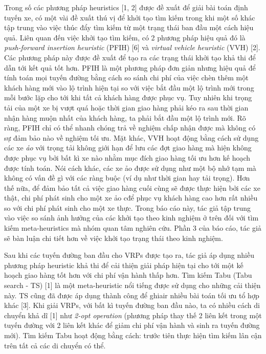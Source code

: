 Trong số các phương pháp heuristics [1, 2] được đề xuất để giải bài toán định tuyến xe, có một vài đề xuất thú vị để khởi tạo tìm kiếm trong khi một số khác tập trung vào việc thúc đẩy tìm kiếm từ một trạng thái ban đầu một cách hiệu quả. Liên quan đến việc khởi tạo tìm kiếm, có 2 phương pháp hiệu quả đó là \textit{push-forward insertion heuristic} (PFIH) [6] và \textit{ virtual vehicle heuristic} (VVH) [2]. Các phương pháp này được đề xuất để tạo ra các trạng thái khởi tạo khả thi để dẫn tới kết quả tốt hơn. PFIH là một phương pháp đơn giản nhưng hiệu quả để tính toán mọi tuyến đường bằng cách so sánh chi phí của việc chèn thêm một khách hàng mới vào lộ trình hiện tại so với việc bắt đầu một lộ trình mới trong mỗi bước lặp cho tới khi tất cả khách hàng được phục vụ. Tuy nhiên khi trọng tải của một xe bị vượt quá hoặc thời gian giao hàng phải kéo ra sau thời gian nhận hàng muộn nhất của khách hàng, ta phải bắt đầu một lộ trình mới. Rõ ràng, PFIH chỉ có thể nhanh chóng trả về nghiệm chấp nhận được mà không có sự đảm bảo nào về nghiệm tối ưu. Mặt khác, VVH hoạt động bằng cách sử dụng các xe \textit{ảo} với trọng tải không giới hạn để lưu các đợt giao hàng mà hiện không được phục vụ bởi bất kì xe nào nhằm mục đích giao hàng tối ưu hơn kế hoạch được tính toán. Nói cách khác, các xe ảo được sử dụng như một bộ nhớ tạm mà không có vấn đề gì với các ràng buộc (ví dụ như thời gian hay tải trọng). Hơn thế nữa, để đảm bảo tất cả việc giao hàng cuối cùng sẽ được thực hiện bởi các xe thật, chi phí phát sinh cho một xe ảo cđể phục vụ khách hàng cao hơn rất nhiều so với chi phí phát sinh cho một xe thực. Trong báo cáo này, tác giả tập trung vào việc so sánh ảnh hưởng của các khởi tạo theo kinh nghiệm ở trên đối với tìm kiếm meta-heuristics mà nhóm quan tâm nghiên cứu. Phần 3 của báo cáo, tác giả sẽ bàn luận chi tiết hơn về việc khởi tạo trạng thái theo kinh nghiệm. 

Sau khi các tuyến đường ban đầu cho VRPs được tạo ra, tác giả áp dụng nhiều phương pháp heuristic khả thi để cải thiện giải pháp hiện tại cho tới một kế hoạch giao hàng tốt hơn với chi phí vận hành thấp hơn. Tìm kiếm Tabu (Tabu search - TS) [1] là một meta-heuristic nổi tiếng được sử dụng cho những cải thiện này. TS cũng đã được áp dụng thành công để ghiair nhiều bài toán tối ưu tổ hợp khác [3]. Khi giải VRPs, với bất kì tuyến đường ban đầu nào, ta có nhiều cách di chuyển khả dĩ [1] như \textit{2-opt operation} (phương pháp thay thế 2 liên kết trong một tuyến đường với 2 liên kết khác để giảm chi phí vận hành và sinh ra tuyến đường mới). Tìm kiếm Tabu hoạt động bằng cách: trước tiên thực hiện tìm kiếm lân cận trên tất cả các di chuyển có thể.